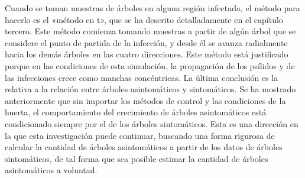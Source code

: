 Cuando se toman muestras de árboles en alguna región infectada, el método para hacerlo es el «método en t», que se ha descrito detalladamente en el capítulo tercero. Este método comienza tomando muestras a partir de algún árbol que se considere el punto de partida de la infección, y desde él se avanza radialmente hacia los demás árboles en las cuatro direcciones. Este método está justificado porque en las condiciones de esta simulación, la propagación de los psílidos y de las infecciones crece como manchas concéntricas. La última conclusión es la relativa a la relación entre árboles asintomáticos y sintomáticos. Se ha mostrado anteriormente que sin importar los métodos de control y las condiciones de la huerta, el comportamiento del crecimiento de árboles asintomáticos está condicionado siempre por el de los árboles sintomáticos. Esta es una dirección en la que esta investigación puede continuar, buscando una forma rigurosa de calcular la cantidad de árboles asintomáticos a partir de los datos de árboles sintomáticos, de tal forma que sea posible estimar la cantidad de árboles asintomáticos a voluntad.

